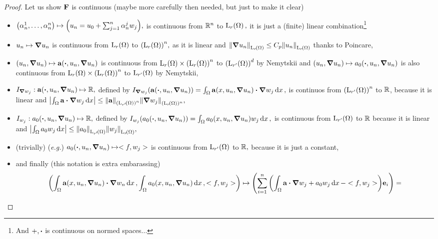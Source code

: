 \documentclass{article}
\begin{document}
\begin{proof}
	Let us show $\vb{F}$ is continuous (maybe more carefully then needed, but just to make it clear)
	\begin{itemize}
		\item $\qty(\alpha_n^1, \dots, \alpha_n^n) \mapsto \qty(u_n = u_0 + \sum_{j=1}^n \alpha^j_n w_j),$ is continuous from ${\mathbb R}^{n}$ to $\LpSet[r]{\Omega},$ it is just a (finite) linear combination\footnote{And $+, \vdot$ is continuous on normed spaces...}
		\item $u_n \mapsto \grad u_n$ is continuous from $\LpSet[r]{\Omega}$ to $\qty(\LpSet[r]{\Omega})^{n},$ as it is linear and $\norm{\grad u_n}_{\LpSet[r]{\Omega}}\leq C_p \norm{u_n}_{\LpSet[r]{\Omega}}$ thanks to Poincare,
		\item $\qty(u_n, \grad u_n) \mapsto \vb{a}\qty(\vdot, u_n, \grad u_n)$ is continuous from $\LpSet[r]{\Omega} \times \qty(\LpSet[r]{\Omega})^{n}$ to $\qty(\LpSet[r']{\Omega})^d$ by Nemytskii and $\qty(u_n, \grad u_n) \mapsto a_0\qty(\vdot, u_n, \grad u_n)$ is also continuous from $\LpSet[r]{\Omega} \times \qty(\LpSet[r]{\Omega})^n$ to $\LpSet[r']{\Omega}$ by Nemytskii,
		\item $I_{\grad w_j}:\vb{a}\qty(\vdot, u_n, \grad u_n) \mapsto \R,$ defined by $I_{\grad w_j}\qty(\vb{a}\qty(\vdot, u_n, \grad u_n)) = \int_{\Omega}\vb{a}\qty(x, u_n, \grad u_n) \vdot \grad w_j\dd{x},$ is continuos from $\qty(\LpSet[r']{\Omega})^{n}$ to ${\mathbb R}$, because it is linear and $\abs{\int_{\Omega}\vb{a} \vdot \grad w_j\dd{x}} \leq \norm{\vb{a}}_{\qty(\LpSet[r']{\Omega})^n} \norm{\grad w_j}_{(\LpSet[r]{\Omega})^n},$
		\item $I_{w_j}:a_0\qty(\vdot, u_n, \grad u_n) \mapsto \R,$ defined by $I_{w_j}\qty(a_0\qty(\vdot, u_n, \grad u_n)) = \int_{\Omega}a_0\qty(x, u_n, \grad u_n)w_j\dd{x},$ is continuous from $\LpSet[r']{\Omega}$ to ${\mathbb R}$ because it is linear and $\abs{\int_{\Omega}a_0 w_j\dd{x}} \leq \norm{a_0}_{\LpSet[r']{\Omega}} \norm{w_j}_{\LpSet[r]{\Omega}},$
		\item (trivially) (\textit{e.g.}) $a_0\qty(\vdot, u_n, \grad u_n) \mapsto <f, w_j>$ is continuous from $\LpSet[r']{\Omega}$ to ${\mathbb R},$ because it is just a constant,
		\item and finally (this notation is extra embarassing)
			\begin{align*}
				&\qty(\int_{\Omega}\vb{a}\qty(x, u_n, \grad u_n) \vdot \grad w_n\dd{x}, \int_{\Omega}a_0\qty(x, u_n, \grad u_n)\dd{x}, <f, w_j>) \mapsto \qty(\sum_{i=1}^n \qty(\int_{\Omega}\vb{a} \vdot \grad w_j + a_0 w_j\dd{x}-<f, w_j>)\vb{e}_i)= \\

\end{align*}
\end{itemize}
\end{proof}
\end{document}
